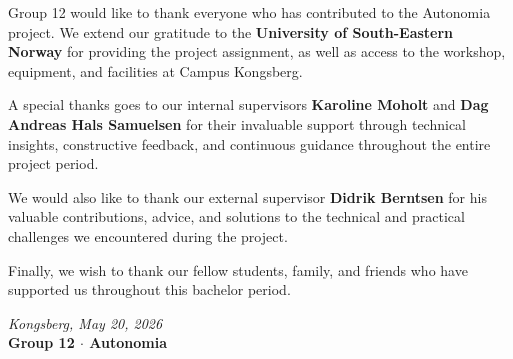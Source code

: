 \noindent Group 12 would like to thank everyone who has contributed to the Autonomia project. 
We extend our gratitude to the \textbf{University of South-Eastern Norway} for providing 
the project assignment, as well as access to the workshop, equipment, and facilities at 
Campus Kongsberg.

\vspace{0.6cm}

\noindent A special thanks goes to our internal supervisors \textbf{Karoline Moholt} and 
\textbf{Dag Andreas Hals Samuelsen} for their invaluable support through technical insights, 
constructive feedback, and continuous guidance throughout the entire project period.

\vspace{0.6cm}

\noindent We would also like to thank our external supervisor \textbf{Didrik Berntsen} for 
his valuable contributions, advice, and solutions to the technical and practical challenges 
we encountered during the project.

\vspace{0.6cm}

\noindent Finally, we wish to thank our fellow students, family, and friends who have 
supported us throughout this bachelor period.

\vspace{1.2cm}

\noindent\textit{\textcolor{midgray}{Kongsberg, May 20, 2026}}\\[0.2cm]
\noindent\textbf{Group 12 \textcolor{accent}{$\cdot$} Autonomia}

\clearpage